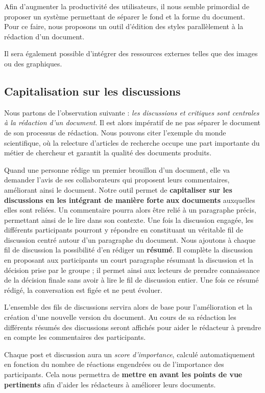 \documentclass[10pt,twocolumn,a4paper,utf8x]{article}
\begin{document}
Afin d'augmenter la productivité des utilisateurs, il nous semble
primordial de proposer un système permettant de séparer le fond et la
forme du document. Pour ce faire, nous proposons un outil d'édition des
styles parallèlement à la rédaction d'un document.

Il sera également possible d'intégrer des ressources externes telles que
des images ou des graphiques.

\subsection{Capitalisation sur les discussions}

Nous partons de l'observation suivante : \emph{les discussions et
critiques sont centrales à la rédaction d'un document}. Il est alors
impératif de ne pas séparer le document de son processus de rédaction.
Nous pouvons citer l'exemple du monde scientifique, où la relecture
d'articles de recherche occupe une part importante du métier de
chercheur et garantit la qualité des documents produits.

Quand une personne rédige un premier brouillon d'un document, elle va
demander l'avis de ses collaborateurs qui proposent leurs commentaires,
améliorant ainsi le document. Notre outil permet de \textbf{capitaliser
sur les discussions en les intégrant de manière forte aux documents}
auxquelles elles sont reliées. Un commentaire pourra alors être relié à
un paragraphe précis, permettant ainsi de le lire dans son contexte. Une
fois la discussion engagée, les différents participants pourront y
répondre en constituant un véritable fil de discussion centré autour
d'un paragraphe du document. Nous ajoutons à chaque fil de discussion la
possibilité d'en rédiger un \textbf{résumé}. Il complète la discussion
en proposant aux participants un court paragraphe résumant la discussion
et la décision prise par le groupe ; il permet ainsi aux lecteurs de
prendre connaissance de la décision finale sans avoir à lire le fil de
discussion entier. Une fois ce résumé rédigé, la conversation est figée
et ne peut évoluer.

L'ensemble des fils de discussions servira alors de base pour
l'amélioration et la création d'une nouvelle version du document. Au
cours de sa rédaction les différents résumés des discussions seront
affichés pour aider le rédacteur à prendre en compte les commentaires
des participants.

Chaque post et discussion aura un \emph{score d'importance}, calculé
automatiquement en fonction du nombre de réactions engendrées ou de
l'importance des participants. Cela nous permettra de \textbf{mettre en
avant les points de vue pertinents} afin d'aider les rédacteurs à
améliorer leurs documents.
\end{document}
